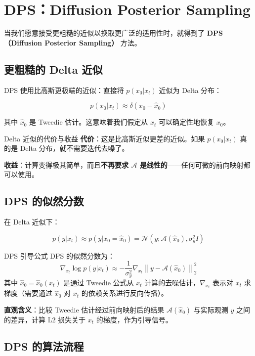 \section{DPS：Diffusion Posterior Sampling}

当我们愿意接受更粗糙的近似以换取更广泛的适用性时，就得到了 \textbf{DPS（Diffusion Posterior Sampling）} 方法。

\subsection{更粗糙的 Delta 近似}

DPS 使用比高斯更极端的近似：直接将 $p(x_0 | x_t)$ 近似为 Delta 分布：

$$
p(x_0 | x_t) \approx \delta(x_0 - \hat{x}_0)
$$

其中 $\hat{x}_0$ 是 Tweedie 估计。这意味着我们假定从 $x_t$ 可以确定性地恢复 $x_0$。

\begin{warningbox}{Delta 近似的代价与收益}
\textbf{代价}：这是比高斯近似更差的近似。如果 $p(x_0|x_t)$ 真的是 Delta 分布，就不需要迭代去噪了。

\textbf{收益}：计算变得极其简单，而且\textbf{不再要求 $\mathcal{A}$ 是线性的}——任何可微的前向映射都可以使用。
\end{warningbox}

\subsection{DPS 的似然分数}

在 Delta 近似下：

$$
p(y | x_t) \approx p(y | x_0 = \hat{x}_0) = \mathcal{N}(y; \mathcal{A}(\hat{x}_0), \sigma_y^2 I)
$$

\begin{importantbox}{DPS 引导公式}
DPS 的似然分数为：
$$
\nabla_{x_t} \log p(y | x_t) \approx -\frac{1}{\sigma_y^2} \nabla_{x_t} \left\| y - \mathcal{A}(\hat{x}_0) \right\|_2^2
$$
其中 $\hat{x}_0 = \hat{x}_0(x_t)$ 是通过 Tweedie 公式从 $x_t$ 计算的去噪估计，$\nabla_{x_t}$ 表示对 $x_t$ 求梯度（需要通过 $\hat{x}_0$ 对 $x_t$ 的依赖关系进行反向传播）。

\textbf{直观含义}：比较 Tweedie 估计经过前向映射后的结果 $\mathcal{A}(\hat{x}_0)$ 与实际观测 $y$ 之间的差异，计算 L2 损失关于 $x_t$ 的梯度，作为引导信号。
\end{importantbox}

\subsection{DPS 的算法流程}

